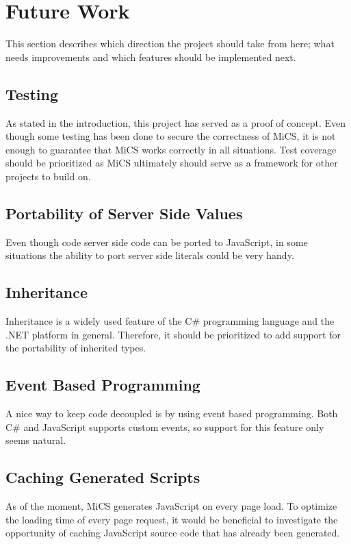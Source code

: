 
\section{Future Work}
\label{sec:futurework}
This section describes which direction the project should take from here; what needs improvements and which features should be implemented next.

\subsection{Testing} %
\label{sub:fw_testing}
	As stated in the introduction, this project has served as a proof of concept. Even though some testing has been done to secure the correctness of MiCS, it is not enough to guarantee that MiCS works correctly in all situations. Test coverage should be prioritized as MiCS ultimately should serve as a framework for other projects to build on.

\subsection{Portability of Server Side Values} %
\label{sub:portability_of_server_side_values}
	Even though code server side code can be ported to JavaScript, in some situations the ability to port server side literals could be very handy. 

\subsection{Inheritance} %
\label{sub:fw_inheritance}
	Inheritance is a widely used feature of the C\# programming language and the .NET platform in general. Therefore, it should be prioritized to add support for the portability of inherited types.

\subsection{Event Based Programming} %
\label{sub:fw_event_based_programming}
	A nice way to keep code decoupled is by using event based programming. Both C\# and JavaScript supports custom events, so support for this feature only seems natural.

\subsection{Caching Generated Scripts} %
\label{sub:fw_script_caching}
	As of the moment, MiCS generates JavaScript on every page load. To optimize the loading time of every page request, it would be beneficial to investigate the opportunity of caching JavaScript source code that has already been generated.
